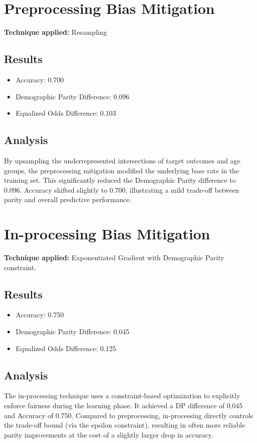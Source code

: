 \documentclass[12pt,a4paper]{article}
\begin{document}
\section{Preprocessing Bias Mitigation}

\textbf{Technique applied:} Resampling

\subsection*{Results}
\begin{itemize}
    \item Accuracy: 0.700
    \item Demographic Parity Difference: 0.096
    \item Equalized Odds Difference: 0.103
\end{itemize}

\subsection*{Analysis}
By upsampling the underrepresented intersections of target outcomes and age groups, the preprocessing mitigation modified the underlying base rate in the training set. This significantly reduced the Demographic Parity difference to 0.096. Accuracy shifted slightly to 0.700, illustrating a mild trade-off between parity and overall predictive performance.

\section{In-processing Bias Mitigation}

\textbf{Technique applied:} Exponentiated Gradient with Demographic Parity constraint.

\subsection*{Results}
\begin{itemize}
    \item Accuracy: 0.750
    \item Demographic Parity Difference: 0.045
    \item Equalized Odds Difference: 0.125
\end{itemize}

\subsection*{Analysis}
The in-processing technique uses a constraint-based optimization to explicitly enforce fairness during the learning phase. It achieved a DP difference of 0.045 and Accuracy of 0.750. Compared to preprocessing, in-processing directly controls the trade-off bound (via the epsilon constraint), resulting in often more reliable parity improvements at the cost of a slightly larger drop in accuracy.
\end{document}
